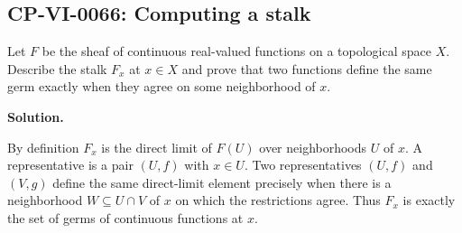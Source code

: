 
\subsection*{CP-VI-0066: Computing a stalk}

Let $F$ be the sheaf of continuous real-valued functions on a topological space $X$. Describe the stalk $F_x$ at $x\in X$ and prove that two functions define the same germ exactly when they agree on some neighborhood of $x$.

\medskip
\noindent\textbf{Solution.}

By definition $F_x$ is the direct limit of $F(U)$ over neighborhoods $U$ of $x$. A representative is a pair $(U,f)$ with $x\in U$. Two representatives $(U,f)$ and $(V,g)$ define the same direct-limit element precisely when there is a neighborhood $W\subseteq U\cap V$ of $x$ on which the restrictions agree. Thus $F_x$ is exactly the set of germs of continuous functions at $x$.
